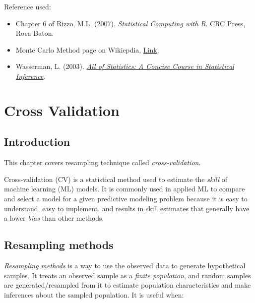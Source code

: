 \documentclass[
  letterpaper,
  DIV=11,
  numbers=noendperiod]{scrreprt}
\begin{document}
Reference used:

\begin{itemize}
\item
  Chapter 6 of Rizzo, M.L. (2007). \emph{Statistical Computing with R}.
  CRC Press, Roca Baton.
\item
  Monte Carlo Method page on Wikiepdia,
  \href{https://en.wikipedia.org/wiki/Monte_Carlo_method}{Link}.
\item
  Wasserman, L. (2003).
  \href{https://egrcc.github.io/docs/math/all-of-statistics.pdf}{\emph{All
  of Statistics: A Concise Course in Statistical Inference}}.
\end{itemize}


\chapter{Cross Validation}\label{cross-validation}

\newcommand{\err}{\mathrm{err}}
\newcommand{\Err}{\mathrm{Err}}
\newcommand{\E}{\mathbb{E}}
\newcommand{\T}{\mathcal{T}}
\newcommand{\D}{\mathcal{D}}
\newcommand{\R}{\mathbb{R}}
\newcommand{\var}{\mathbb{V}ar}
\newcommand{\bias}{\mathbb{B}\mathrm{ias}}
\newcommand{\mse}{\mathrm{MSE}}

\section{Introduction}\label{introduction}

This chapter covers resampling technique called \emph{cross-validation}.

Cross-validation (CV) is a statistical method used to estimate the
\emph{skill} of machine learning (ML) models. It is commonly used in
applied ML to compare and select a model for a given predictive modeling
problem because it is easy to understand, easy to implement, and results
in skill estimates that generally have a lower \emph{bias} than other
methods.

\section{Resampling methods}\label{resampling-methods}

\emph{Resampling methods} is a way to use the observed data to generate
hypothetical samples. It treats an observed sample as a \emph{finite
population}, and random samples are generated/resampled from it to
estimate population characteristics and make inferences about the
sampled population. It is useful when:
\end{document}
